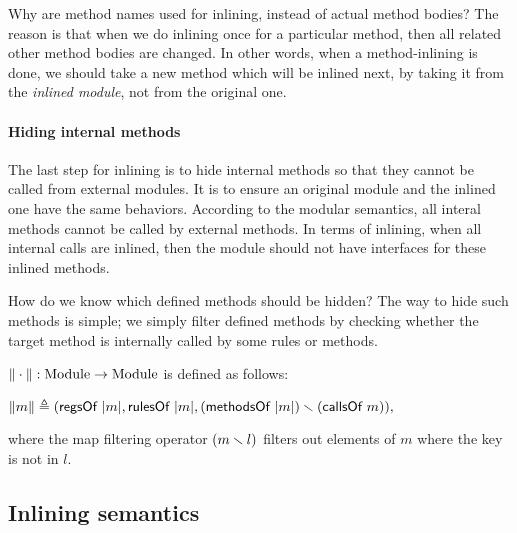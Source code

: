 Why are method names used for inlining, instead of actual method
bodies? The reason is that when we do inlining once for a particular
method, then all related other method bodies are changed. In other
words, when a method-inlining is done, we should take a new method
which will be inlined next, by taking it from the \emph{inlined
  module}, not from the original one.

\paragraph{Hiding internal methods}

The last step for inlining is to hide internal methods so that they
cannot be called from external modules. It is to ensure an original
module and the inlined one have the same behaviors. According to the
modular semantics, all interal methods cannot be called by external
methods. In terms of inlining, when all internal calls are inlined,
then the module should not have interfaces for these inlined methods.

How do we know which defined methods should be hidden? The way to hide
such methods is simple; we simply filter defined methods by checking
whether the target method is internally called by some rules or
methods.

\begin{definition}
  \label{def-inlineF}
  $\| \cdot \| : \textrm{Module} \to \textrm{Module}$ is defined
  as follows:
  \begin{center}
    \begin{math}
      \| m \| \triangleq
      (\textsf{regsOf}\ | m |,
      \textsf{rulesOf}\ | m |,
      (\textsf{methodsOf}\ | m |) \smallsetminus{} (\textsf{callsOf}\ m)),
    \end{math}
  \end{center}
\end{definition}
where the map filtering operator $(m \smallsetminus{} l)$ filters out
elements of $m$ where the key is not in $l$.

\subsection{Inlining semantics}

